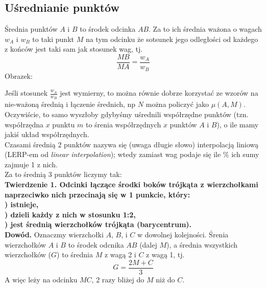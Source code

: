 \documentclass{article}
\begin{document}
\subsection{Uśrednianie punktów}
Średnia punktów $A$ i $B$ to środek odcinka $AB$. Za to ich średnia ważona o wagach $w_A$ i $w_B$ to taki punkt $M$ na tym odcinku że sotsunek jego odległości od każdego z końców jest taki sam jak stosunek wag, tj.\[
	\frac{MB}{MA}=\frac{w_A}{w_B}
\]Obrazek:
\begin{center}\end{center}
Jeśli stosunek $\frac{w_A}{w_B}$ jest wymierny, to można równie dobrze korzystać ze wzorów na nie-ważoną średnią i łączenie średnich, np $N$ można policzyć jako $\mu(A, M)$.
Oczywiście, to samo wyszłoby gdybyśmy uśrednili współrzędne punktów (tzn. współrzędna $x$ punktu $m$ to śrenia współrzędnych $x$ punktów $A$ i $B$), o ile mamy jakiś układ współrzędnych.\\
Czasami średnią 2 punktów nazywa się (uwaga długie słowo) interpolacją liniową (LERP-em od \textit{linear interpolation}); wtedy zamiast wag podaje się ile \% ich sumy zajmuje 1 z nich.\\
Za to średnią 3 punktów liczymy tak:
\\\textbf{Twierdzenie 1. Odcinki łączące środki boków trójkąta z wierzchołkami naprzeciwko nich przecinają się w 1 punkcie, który:
\\) istnieje, 
\\) dzieli każdy z nich w stosunku 1:2, 
\\) jest średnią wierzchołków trójkąta (barycentrum).
\\Dowód. }Oznaczmy wierzchołki $A$, $B$, i $C$ w dowolnej kolejności.
Śrenia wierzchołków $A$ i $B$ to środek odcnika $AB$ (dalej $M$), a średnia wszystkich wierzchołków ($G$) to średnia $M$ z wagą 2 i $C$ z wagą 1, tj.\[
	G=\frac{2M+C}{3}
\]A więc leży na odcinku $MC$, 2 razy bliżej do $M$ niż do $C$.
\end{document}
